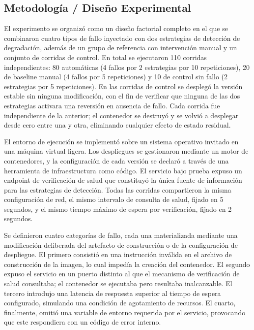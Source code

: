 \documentclass[conference]{IEEEtran}
\begin{document}
\subsection{Metodolog\'ia / Dise\~no Experimental}

El experimento se organiz\'o como un dise\~no factorial completo en el que se combinaron cuatro tipos de fallo inyectado con dos estrategias de detecci\'on de degradaci\'on, adem\'as de un grupo de referencia con intervenci\'on manual y un conjunto de corridas de control. En total se ejecutaron 110 corridas independientes: 80 autom\'aticas (4 fallos por 2 estrategias por 10 repeticiones), 20 de baseline manual (4 fallos por 5 repeticiones) y 10 de control sin fallo (2 estrategias por 5 repeticiones). En las corridas de control se despleg\'o la versi\'on estable sin ninguna modificaci\'on, con el fin de verificar que ninguna de las dos estrategias activara una reversi\'on en ausencia de fallo. Cada corrida fue independiente de la anterior; el contenedor se destruy\'o y se volvi\'o a desplegar desde cero entre una y otra, eliminando cualquier efecto de estado residual.

El entorno de ejecuci\'on se implement\'o sobre un sistema operativo invitado en una m\'aquina virtual ligera. Los despliegues se gestionaron mediante un motor de contenedores, y la configuraci\'on de cada versi\'on se declar\'o a trav\'es de una herramienta de infraestructura como c\'odigo. El servicio bajo prueba expuso un endpoint de verificación de salud que constituy\'o la \'unica fuente de informaci\'on para las estrategias de detecci\'on. Todas las corridas compartieron la misma configuraci\'on de red, el mismo intervalo de consulta de salud, fijado en 5 segundos, y el mismo tiempo m\'aximo de espera por verificaci\'on, fijado en 2 segundos.

Se definieron cuatro categor\'ias de fallo, cada una materializada mediante una modificaci\'on deliberada del artefacto de construcci\'on o de la configuraci\'on de despliegue. El primero consisti\'o en una instrucci\'on inv\'alida en el archivo de construcci\'on de la imagen, lo cual imped\'ia la creaci\'on del contenedor. El segundo expuso el servicio en un puerto distinto al que el mecanismo de verificaci\'on de salud consultaba; el contenedor se ejecutaba pero resultaba inalcanzable. El tercero introdujo una latencia de respuesta superior al tiempo de espera configurado, simulando una condici\'on de agotamiento de recursos. El cuarto, finalmente, omiti\'o una variable de entorno requerida por el servicio, provocando que este respondiera con un c\'odigo de error interno.
\end{document}
